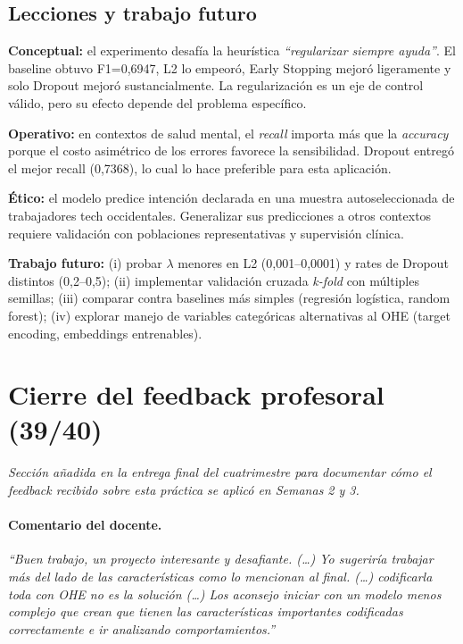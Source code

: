 \documentclass[10pt,a4paper,twocolumn]{article}
\begin{document}
\subsection{Lecciones y trabajo futuro}

\textbf{Conceptual:} el experimento desafía la heurística \textit{``regularizar siempre ayuda''}. El baseline obtuvo F1=0,6947, L2 lo empeoró, Early Stopping mejoró ligeramente y solo Dropout mejoró sustancialmente. La regularización es un eje de control válido, pero su efecto depende del problema específico.

\textbf{Operativo:} en contextos de salud mental, el \textit{recall} importa más que la \textit{accuracy} porque el costo asimétrico de los errores favorece la sensibilidad. Dropout entregó el mejor recall (0,7368), lo cual lo hace preferible para esta aplicación.

\textbf{Ético:} el modelo predice intención declarada en una muestra autoseleccionada de trabajadores tech occidentales. Generalizar sus predicciones a otros contextos requiere validación con poblaciones representativas y supervisión clínica.

\textbf{Trabajo futuro:} (i) probar $\lambda$ menores en L2 (0,001--0,0001) y rates de Dropout distintos (0,2--0,5); (ii) implementar validación cruzada \textit{k-fold} con múltiples semillas; (iii) comparar contra baselines más simples (regresión logística, random forest); (iv) explorar manejo de variables categóricas alternativas al OHE (target encoding, embeddings entrenables).

\section{Cierre del feedback profesoral (39/40)}

\textit{Sección añadida en la entrega final del cuatrimestre para documentar cómo el feedback recibido sobre esta práctica se aplicó en Semanas 2 y 3.}

\paragraph{Comentario del docente.} \textit{``Buen trabajo, un proyecto interesante y desafiante. (\ldots) Yo sugeriría trabajar más del lado de las características como lo mencionan al final. (\ldots) codificarla toda con OHE no es la solución (\ldots) Los aconsejo iniciar con un modelo menos complejo que crean que tienen las características importantes codificadas correctamente e ir analizando comportamientos.''}
\end{document}
